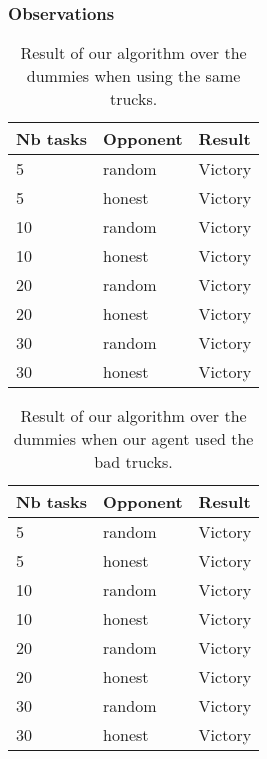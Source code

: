 \documentclass[11pt]{article}
\begin{document}
\subsubsection{Observations}
\begin{table}
  \begin{center}
    \begin{tabular}{ | l | l | l | }
    \hline
    Nb tasks & Opponent & Result   \\ \hline
    5 & random & Victory \\ \hline
    5 & honest & Victory \\ \hline
    10 & random & Victory \\ \hline
    10 & honest & Victory \\ \hline
    20 & random & Victory \\ \hline
    20 & honest & Victory \\ \hline
    30 & random & Victory \\ \hline
    30 & honest & Victory \\ \hline

    
    \end{tabular}
    \caption{Result of our algorithm over the dummies when using the same trucks.}
    \label{tab:1}
\end{center}
\end{table}

\begin{table}
  \begin{center}
    \begin{tabular}{ | l | l | l | }
    \hline
    Nb tasks & Opponent & Result   \\ \hline
    5 & random & Victory \\ \hline
    5 & honest & Victory \\ \hline
    10 & random & Victory \\ \hline
    10 & honest & Victory \\ \hline
    20 & random & Victory \\ \hline
    20 & honest & Victory \\ \hline
    30 & random & Victory \\ \hline
    30 & honest & Victory \\ \hline

    
    \end{tabular}
    \caption{Result of our algorithm over the dummies when our agent used the bad trucks.}
    \label{tab:1}
\end{center}
\end{table}
\end{document}
